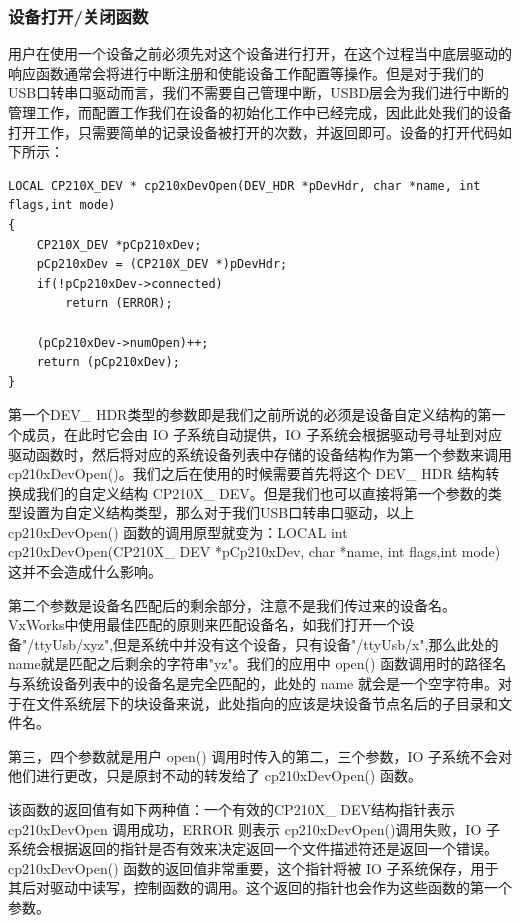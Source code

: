 \subsubsection{设备打开/关闭函数}

	用户在使用一个设备之前必须先对这个设备进行打开，在这个过程当中底层驱动的响应函数通常会将进行中断注册和使能设备工作配置等操作。但是对于我们的USB口转串口驱动而言，我们不需要自己管理中断，USBD层会为我们进行中断的管理工作，而配置工作我们在设备的初始化工作中已经完成，因此此处我们的设备打开工作，只需要简单的记录设备被打开的次数，并返回即可。设备的打开代码如下所示：
	
\lstset{language=C}
\begin{lstlisting}
LOCAL CP210X_DEV * cp210xDevOpen(DEV_HDR *pDevHdr, char *name, int flags,int mode)
{
	CP210X_DEV *pCp210xDev;
	pCp210xDev = (CP210X_DEV *)pDevHdr;
	if(!pCp210xDev->connected)	
		return (ERROR);
		
	(pCp210xDev->numOpen)++;
	return (pCp210xDev);
}
\end{lstlisting}

	第一个DEV\_ HDR类型的参数即是我们之前所说的必须是设备自定义结构的第一个成员，在此时它会由 IO 子系统自动提供，IO 子系统会根据驱动号寻址到对应驱动函数时，然后将对应的系统设备列表中存储的设备结构作为第一个参数来调用 cp210xDevOpen()。我们之后在使用的时候需要首先将这个 DEV\_ HDR 结构转换成我们的自定义结构 CP210X\_ DEV。但是我们也可以直接将第一个参数的类型设置为自定义结构类型，那么对于我们USB口转串口驱动，以上  cp210xDevOpen() 函数的调用原型就变为：LOCAL int cp210xDevOpen(CP210X\_ DEV *pCp210xDev, char *name, int flags,int mode)这并不会造成什么影响。
		
	第二个参数是设备名匹配后的剩余部分，注意不是我们传过来的设备名。VxWorks中使用最佳匹配的原则来匹配设备名，如我们打开一个设备"/ttyUsb/xyz",但是系统中并没有这个设备，只有设备"/ttyUsb/x",那么此处的name就是匹配之后剩余的字符串"yz"。我们的应用中 open() 函数调用时的路径名与系统设备列表中的设备名是完全匹配的，此处的 name 就会是一个空字符串。对于在文件系统层下的块设备来说，此处指向的应该是块设备节点名后的子目录和文件名。

	第三，四个参数就是用户 open() 调用时传入的第二，三个参数，IO 子系统不会对他们进行更改，只是原封不动的转发给了 cp210xDevOpen() 函数。
	
	该函数的返回值有如下两种值：一个有效的CP210X\_ DEV结构指针表示 cp210xDevOpen 调用成功，ERROR 则表示 cp210xDevOpen()调用失败，IO 子系统会根据返回的指针是否有效来决定返回一个文件描述符还是返回一个错误。cp210xDevOpen() 函数的返回值非常重要，这个指针将被 IO 子系统保存，用于其后对驱动中读写，控制函数的调用。这个返回的指针也会作为这些函数的第一个参数。
	
